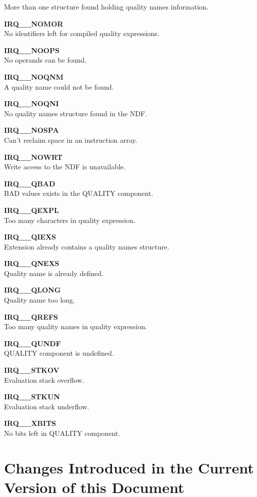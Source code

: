 \begin{description}
More than one structure found holding quality names information.
\item {\bf IRQ\_\_NOMOR}\\
No identifiers left for compiled quality expressions.
\item {\bf IRQ\_\_NOOPS}\\
No operands can be found.
\item {\bf IRQ\_\_NOQNM}\\
A quality name could not be found.
\item {\bf IRQ\_\_NOQNI}\\
No quality names structure found in the NDF.
\item {\bf IRQ\_\_NOSPA}\\
Can't reclaim space in an instruction array.
\item {\bf IRQ\_\_NOWRT}\\
Write access to the NDF is unavailable.
\item {\bf IRQ\_\_QBAD }\\
BAD values exists in the QUALITY component.
\item {\bf IRQ\_\_QEXPL}\\
Too many characters in quality expression.
\item {\bf IRQ\_\_QIEXS}\\
Extension already contains a quality names structure.
\item {\bf IRQ\_\_QNEXS}\\
Quality name is already defined.
\item {\bf IRQ\_\_QLONG}\\
Quality name too long.
\item {\bf IRQ\_\_QREFS}\\
Too many quality names in quality expression.
\item {\bf IRQ\_\_QUNDF}\\
QUALITY component is undefined.
\item {\bf IRQ\_\_STKOV}\\
Evaluation stack overflow.
\item {\bf IRQ\_\_STKUN}\\
Evaluation stack underflow.
\item {\bf IRQ\_\_XBITS}\\
No bits left in QUALITY component.
\end{description}

\section {Changes Introduced in the Current Version of this Document}
\label {SEC:CHANGES}

